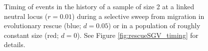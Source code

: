 \documentclass[]{article}
\begin{document}
\begin{figure}[htbp]
\caption{
Timing of events in the history of a sample of size 2 at a linked neutral locus ($r=0.01$) during a selective sweep from migration in evolutionary rescue (blue; $d=0.05$) or in a population of roughly constant size (red; $d=0$).
See Figure \ref{fig:rescueSGV_timing} for details.
}%
\label{fig:rescueMIG_timing}
\end{figure}
\end{document}
